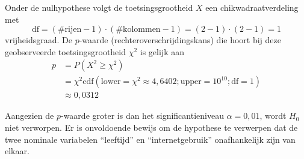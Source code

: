 \begin{enumerate}[label=(\alph*)]
{        Onder de nulhypothese volgt de toetsingsgrootheid $X$ een chikwadraatverdeling met
        \[
            \text{df} = (\#\text{rijen}-1) \cdot (\#\text{kolommen}-1) = (2-1)\cdot(2-1) = 1
        \]
        vrijheidsgraad.
        De $p$-waarde (rechteroverschrijdingskans) die hoort bij deze geobserveerde toetsingsgrootheid $\chi^2$ is gelijk aan
        \begin{align*}
            p   &= P(X^2 \ge \chi^2) \\
                &= \chi^2\text{cdf}(\text{lower}=\chi^2\approx4,6402; \text{upper}=10^{10}; \text{df}=1) \\
                &\approx 0,0312
        \end{align*}

        Aangezien de $p$-waarde groter is dan het significantieniveau $\alpha=0,01$, wordt $H_0$ niet verworpen.
        Er is onvoldoende bewijs om de hypothese te verwerpen dat de twee nominale variabelen ``leeftijd'' en ``internetgebruik'' onafhankelijk zijn van elkaar.
        
        \begin{center}
        \end{center}
    }
\end{enumerate}